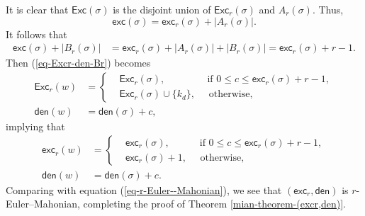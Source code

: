 \documentclass[12pt]{article}
\begin{document}
It is clear that $\textsf{Exc}(\sigma)$ is the disjoint union of $\textsf{Exc}_{r}(\sigma)$ and $A_{r}(\sigma)$. Thus,
$$\textsf{exc}(\sigma)=\textsf{exc}_{r}(\sigma)+|A_{r}(\sigma)|.$$
It follows that
\vspace{-6pt}
\begin{align*}
\textsf{exc}(\sigma)+|B_{r}(\sigma)|&=\textsf{exc}_{r}(\sigma)+|A_{r}(\sigma)|+|B_{r}(\sigma)|=\textsf{exc}_{r}(\sigma)+r-1.
\end{align*}
Then (\ref{eq-Excr-den-Br}) becomes
\begin{equation*} 
	\begin{split}
		\textsf{Exc}_{r}(w)&=\left
		\{
		\begin{aligned}
			&\textsf{Exc}_{r}(\sigma), \quad\quad\quad\quad~\text{if~}0\leq c\leq \textsf{exc}_{r}(\sigma)+r-1,\\
			&\textsf{Exc}_{r}(\sigma)\cup\{k_{d}\},\quad\text{~otherwise,}
		\end{aligned}
		\right.\\ 
		\textsf{den}(w)&=\textsf{den}(\sigma)+c,
	\end{split}
\end{equation*}
implying that
\vspace{-6pt}
\begin{equation}\label{eq-(excr,den)-all}
	\begin{split}
		\textsf{exc}_{r}(w)&=\left
		\{
		\begin{aligned}
			&\textsf{exc}_{r}(\sigma), \quad\quad\quad\text{if~}0\leq c\leq \textsf{exc}_{r}(\sigma)+r-1,\\
			&\textsf{exc}_{r}(\sigma)+1,\quad\text{~otherwise,}
		\end{aligned}
		\right.\\ 
		\textsf{den}(w)&=\textsf{den}(\sigma)+c.
	\end{split}
\end{equation}
Comparing with equation (\ref{eq-r-Euler--Mahonian}),
we see that $(\textsf{exc}_{r},\textsf{den})$ is $r$-Euler--Mahonian,
completing the proof of Theorem \ref{mian-theorem-(excr,den)}.
\end{document}
